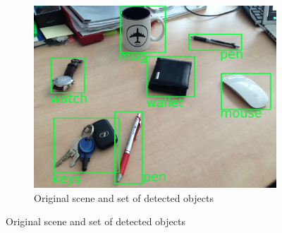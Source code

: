 \documentclass[conference]{IEEEtran}
\begin{document}
	
	\begin{figure}[th!]
		\center
		\begin{subfigure}{1.0\columnwidth}
			\center
			\includegraphics[width=0.6\columnwidth]{img/map_original.jpg}
			\caption{Original scene and set of detected objects}
			\label{fig:object-detection}
		\end{subfigure}
		

\end{figure}
\end{document}
